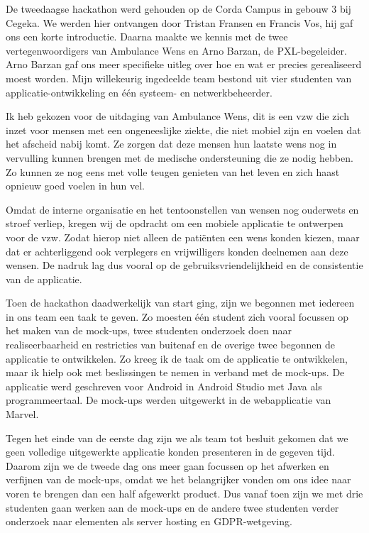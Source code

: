 

De tweedaagse hackathon werd gehouden op de Corda Campus in gebouw 3 bij Cegeka. We werden hier ontvangen door Tristan Fransen en Francis Vos, hij gaf ons een korte introductie. Daarna maakte we kennis met de twee vertegenwoordigers van Ambulance Wens en Arno Barzan, de PXL\hyp{}begeleider. Arno Barzan gaf ons meer specifieke uitleg over hoe en wat er precies gerealiseerd moest worden. Mijn willekeurig ingedeelde team bestond uit vier studenten van applicatie\hyp{}ontwikkeling en één systeem\hyp{} en netwerkbeheerder.

Ik heb gekozen voor de uitdaging van Ambulance Wens, dit is een vzw die zich inzet voor mensen met een ongeneeslijke ziekte, die niet mobiel zijn en voelen dat het afscheid nabij komt. Ze zorgen dat deze mensen hun laatste wens nog in vervulling kunnen brengen met de medische ondersteuning die ze nodig hebben. Zo kunnen ze nog eens met volle teugen genieten van het leven en zich haast opnieuw goed voelen in hun vel.

Omdat de interne organisatie en het tentoonstellen van wensen nog ouderwets en stroef verliep, kregen wij de opdracht om een mobiele applicatie te ontwerpen voor de vzw. Zodat hierop niet alleen de pati\"enten een wens konden kiezen, maar dat er achterliggend ook verplegers en vrijwilligers konden deelnemen aan deze wensen. De nadruk lag dus vooral op de gebruiksvriendelijkheid en de consistentie van de applicatie.

Toen de hackathon daadwerkelijk van start ging, zijn we begonnen met iedereen in ons team een taak te geven. Zo moesten één student zich vooral focussen op het maken van de mock\hyp{}ups, twee studenten onderzoek doen naar realiseerbaarheid en restricties van buitenaf en de overige twee begonnen de applicatie te ontwikkelen. Zo kreeg ik de taak om de applicatie te ontwikkelen, maar ik hielp ook met beslissingen te nemen in verband met de mock\hyp{}ups. De applicatie werd geschreven voor Android in Android Studio met Java als programmeertaal. De mock\hyp{}ups werden uitgewerkt in de webapplicatie van Marvel.

Tegen het einde van de eerste dag zijn we als team tot besluit gekomen dat we geen volledige uitgewerkte applicatie konden presenteren in de gegeven tijd. Daarom zijn we de tweede dag ons meer gaan focussen op het afwerken en verfijnen van de mock\hyp{}ups, omdat we het belangrijker vonden om ons idee naar voren te brengen dan een half afgewerkt product. Dus vanaf toen zijn we met drie studenten gaan werken aan de mock\hyp{}ups en de andere twee studenten verder onderzoek naar elementen als server hosting en GDPR\hyp{}wetgeving.

